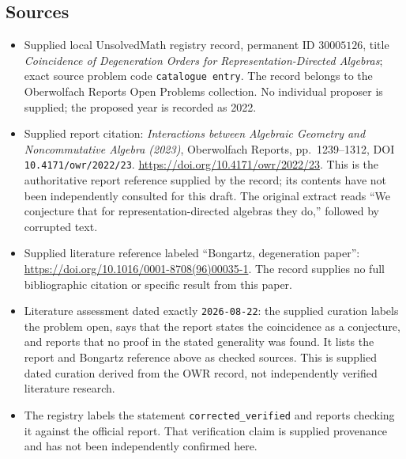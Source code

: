 \documentclass[11pt]{article}
\begin{document}
\subsection{Sources}
\begin{itemize}
\item Supplied local UnsolvedMath registry record, permanent ID \(30005126\), title \emph{Coincidence of Degeneration Orders for Representation-Directed Algebras}; exact source problem code \texttt{catalogue entry}. The record belongs to the Oberwolfach Reports Open Problems collection. No individual proposer is supplied; the proposed year is recorded as 2022.
\item Supplied report citation: \emph{Interactions between Algebraic Geometry and Noncommutative Algebra (2023)}, Oberwolfach Reports, pp.\ 1239--1312, DOI \texttt{10.4171/owr/2022/23}. \url{https://doi.org/10.4171/owr/2022/23}. This is the authoritative report reference supplied by the record; its contents have not been independently consulted for this draft. The original extract reads ``We conjecture that for representation-directed algebras they do,'' followed by corrupted text.
\item Supplied literature reference labeled ``Bongartz, degeneration paper'': \url{https://doi.org/10.1016/0001-8708(96)00035-1}. The record supplies no full bibliographic citation or specific result from this paper.
\item Literature assessment dated exactly \texttt{2026-08-22}: the supplied curation labels the problem open, says that the report states the coincidence as a conjecture, and reports that no proof in the stated generality was found. It lists the report and Bongartz reference above as checked sources. This is supplied dated curation derived from the OWR record, not independently verified literature research.
\item The registry labels the statement \texttt{corrected\_verified} and reports checking it against the official report. That verification claim is supplied provenance and has not been independently confirmed here.
\end{itemize}
\end{document}
